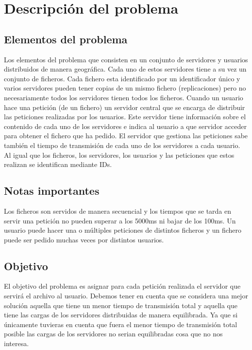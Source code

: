 


\section{Descripción del problema}


\subsection{Elementos del problema}

Los elementos del problema que consisten en un conjunto de servidores y usuarios distribuidos de manera geográfica. Cada
uno de estos servidores tiene a su vez un conjunto de ficheros. Cada fichero esta identificado por un identificador
único y varios servidores pueden tener copias de un mismo fichero (replicaciones) pero no necesariamente todos
los servidores tienen todos los ficheros. Cuando un usuario hace una petición (de un fichero)
un servidor central que se encarga de distribuir las peticiones realizadas por los usuarios. Este servidor tiene información
sobre el contenido de cada uno de los servidores e indica al usuario a que
servidor acceder para obtener el fichero que ha pedido. El servidor que gestiona las peticiones sabe también el tiempo
de transmisión de cada uno de los servidores a cada usuario. Al igual que los ficheros, los servidores, los usuarios y
las peticiones que estos realizan se identifican mediante IDs.

\subsection{Notas importantes}

Los ficheros son servidos de manera secuencial y los tiempos que se tarda en servir una petición no pueden superar a los 5000ms ni bajar de los 100ms. Un usuario puede hacer una o múltiples peticiones de distintos ficheros y un fichero puede ser pedido muchas veces por distintos usuarios.

\subsection{Objetivo}

El objetivo del problema es asignar para cada petición realizada el servidor que servirá el archivo al usuario.
Debemos tener en cuenta que se considera una mejor solución aquella que tiene un menor tiempo de transmisión total y aquella que tiene las cargas de los servidores distribuidas de manera equilibrada. Ya que si únicamente tuvieras en cuenta que fuera el menor tiempo de transmisión total posible las cargas de los servidores no serian equilibradas cosa que no nos interesa.

